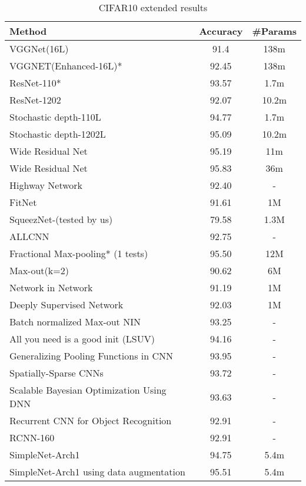 \documentclass{article} \usepackage{lets_keepit_simple,times}
\begin{document}
\begin{table}[H]
\caption{CIFAR10 extended results}\label{tab:cifar10_appndx}
\begin{center}
\begin{tabular}{lcc}
\textbf{Method} & \textbf{Accuracy} & \textbf{\#Params}\\ \hline
VGGNet(16L)\cite{Sergey_CIFAR10_OnTorch_2015}  & 91.4  & 138m\\
VGGNET(Enhanced-16L)\cite{Sergey_CIFAR10_OnTorch_2015}* & 92.45	& 138m\\
ResNet-110\cite{He_ResNet_2015}* & 93.57 & 1.7m\\
ResNet-1202\cite{He_ResNet_2015} & 92.07 & 10.2m\\
Stochastic depth-110L\cite{Huang_DeepNN_StochDepth_2016} & 94.77 & 1.7m \\
Stochastic depth-1202L\cite{Huang_DeepNN_StochDepth_2016} & 95.09 & 10.2m \\
Wide Residual Net\cite{Zagoruyko_WRN_2016} & 95.19 & 11m \\
Wide Residual Net\cite{Zagoruyko_WRN_2016} & 95.83 & 36m \\
Highway Network\cite{Srivastava_HighwayNets_2015} & 92.40 & - \\
FitNet\cite{Romero_Fitnet_2014} & 91.61 & 1M \\
SqueezNet\cite{Iandola_squeezenet_2016}-(tested by us) & 79.58 & 1.3M \\
ALLCNN\cite{Springenberg_StrivingForSimplicity_2014} & 92.75 & - \\
Fractional Max-pooling* (1 tests)\cite{Graham_FractionalMaxpooling_2014} & 95.50 & 12M \\
Max-out(k=2)\cite{Goodfellow_MaxoutNetwork_2013} & 90.62 & 6M \\
Network in Network\cite{Lin_NIN_2013} & 91.19 & 1M \\
Deeply Supervised Network\cite{Lee_DeeplySupervisedNet_2015} & 92.03 & 1M \\
Batch normalized Max-out NIN\cite{JiaRen_BatchNormMaxoutNIN_2015} & 93.25 & - \\
All you need is a good init (LSUV)\cite{Mishkin_AllYouNeedIsGoodInit_2016} & 94.16 & - \\
Generalizing Pooling Functions in CNN\cite{Lee_CNN_Mixed_gated_2016} & 93.95 & - \\
Spatially-Sparse CNNs\cite{Graham_Spatilly_sparse_CNN_2014} & 93.72 & - \\
\small{Scalable Bayesian Optimization Using DNN}\cite{Snoek_ScalableBayesianoptemiz_2015} & 93.63 & - \\
Recurrent CNN for Object Recognition\cite{Liang_RecurrentCNN_2015} & 92.91 & - \\
RCNN-160\cite{Liang_RecurrentCNN_2015} & 92.91 & - \\
SimpleNet-Arch1 & 94.75 & 5.4m \\
SimpleNet-Arch1 using data augmentation & 95.51 & 5.4m \\ \hline
\end{tabular}
\end{center}
\end{table}
\end{document}
